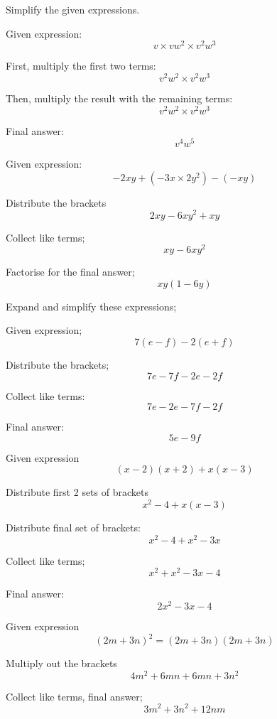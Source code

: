 \documentclass[a4paper]{tufte-handout}
\begin{document}
\begin{question}

\qpart
Simplify the given expressions.

\qsubpart
Given expression:
	\[v \times vw^2 \times v^2w^3\]

\bigskip

First, multiply the first two terms:
	\[v^2w^2 \times v^2w^3\]

\bigskip

Then, multiply the result with the remaining terms:
	\[v^2w^2 \times v^2w^3\]

\bigskip

Final answer:
	\[v^4w^5\]
	
\vspace{1.5cm}
	
\qsubpart
Given expression:
	\[-2xy + (-3x \times 2y^2) - (-xy)\]
	
\bigskip	
	
Distribute the brackets
	\[2xy -6xy^2 + xy\]
	
\bigskip	
	
Collect like terms;
	\[xy -6xy^2\]
	
\bigskip
	
Factorise for the final answer; 
	\[xy(1-6y)\]

\pagebreak

\qpart
Expand and simplify these expressions;
	
\qsubpart
Given expression;
\[7(e-f) -2(e+f)\]

\bigskip

Distribute the brackets;
	\[7e - 7f -2e -2f\]
	
\bigskip	
	
Collect like terms:
	\[7e -2e -7f -2f\]
	
\bigskip
	
Final answer:
	\[5e -9f\]
	
\vspace{1.5cm}
	
\qsubpart
Given expression
	\[(x-2)(x+2) + x(x-3) \]
	
\bigskip	
	
Distribute first 2 sets of brackets
	\[x^2 -4 + x(x-3)\]
	
\bigskip	
	
Distribute final set of brackets:
	\[x^2 -4 +x^2 -3x\]
	
\bigskip	
	
Collect like terms;
	\[x^2 + x^2 -3x -4\]
	
\bigskip
	
Final answer:
	\[2x^2 -3x -4\]
	
\pagebreak
	
\qsubpart
Given expression
	\[(2m +3n)^2 = (2m +3n)(2m +3n)\]
	
\bigskip	
	
Multiply out the brackets
	\[4m^2 +6mn +6mn +3n^2\]
	
\bigskip
	
Collect like terms, final answer;
	\[3m^2 +3n^2 +12nm\]
	
\vspace{1.5cm}

\end{question}
\end{document}
